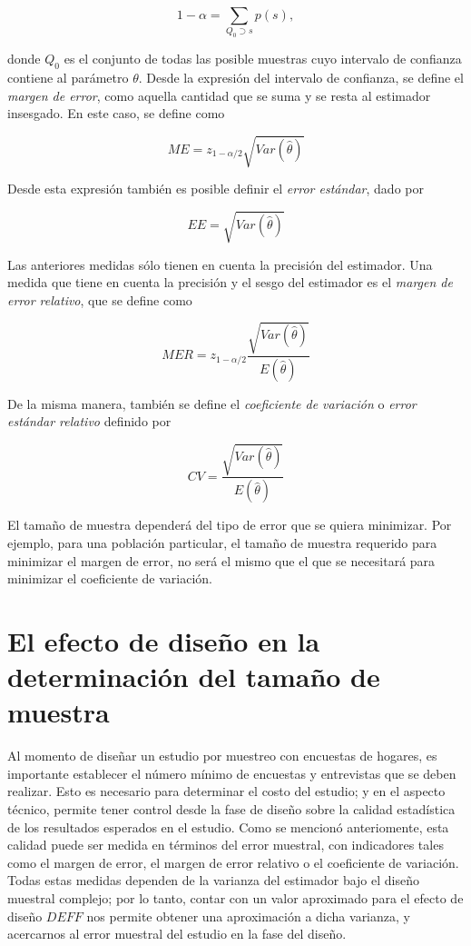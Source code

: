 \documentclass[
  12pt,
]{book}
\begin{document}
\[
1-\alpha=\sum_{Q_0 \supset s}p(s),
\]

donde \(Q_0\) es el conjunto de todas las posible muestras cuyo intervalo de confianza contiene al parámetro \(\theta\). Desde la expresión del intervalo de confianza, se define el \emph{margen de error}, como aquella cantidad que se suma y se resta al estimador insesgado. En este caso, se define como

\[
ME = z_{1-\alpha / 2}\sqrt{ Var(\hat{\theta})}
\]

Desde esta expresión también es posible definir el \emph{error estándar}, dado por

\[
EE = \sqrt{ Var(\hat{\theta})}
\]

Las anteriores medidas sólo tienen en cuenta la precisión del estimador. Una medida que tiene en cuenta la precisión y el sesgo del estimador es el \emph{margen de error relativo}, que se define como

\[
MER = z_{1-\alpha / 2}\frac{\sqrt{ Var(\hat{\theta})}}{E(\hat{\theta})}
\]

De la misma manera, también se define el \emph{coeficiente de variación} o \emph{error estándar relativo} definido por

\[
CV =  \frac{\sqrt{ Var(\hat{\theta})}}{E(\hat{\theta})}
\]

El tamaño de muestra dependerá del tipo de error que se quiera minimizar. Por ejemplo, para una población particular, el tamaño de muestra requerido para minimizar el margen de error, no será el mismo que el que se necesitará para minimizar el coeficiente de variación.

\hypertarget{el-efecto-de-diseuxf1o-en-la-determinaciuxf3n-del-tamauxf1o-de-muestra}{%
\section{El efecto de diseño en la determinación del tamaño de muestra}\label{el-efecto-de-diseuxf1o-en-la-determinaciuxf3n-del-tamauxf1o-de-muestra}}

Al momento de diseñar un estudio por muestreo con encuestas de hogares, es importante establecer el número mínimo de encuestas y entrevistas que se deben realizar. Esto es necesario para determinar el costo del estudio; y en el aspecto técnico, permite tener control desde la fase de diseño sobre la calidad estadística de los resultados esperados en el estudio. Como se mencionó anteriomente, esta calidad puede ser medida en términos del error muestral, con indicadores tales como el margen de error, el margen de error relativo o el coeficiente de variación. Todas estas medidas dependen de la varianza del estimador bajo el diseño muestral complejo; por lo tanto, contar con un valor aproximado para el efecto de diseño \(DEFF\) nos permite obtener una aproximación a dicha varianza, y acercarnos al error muestral del estudio en la fase del diseño.
\end{document}
